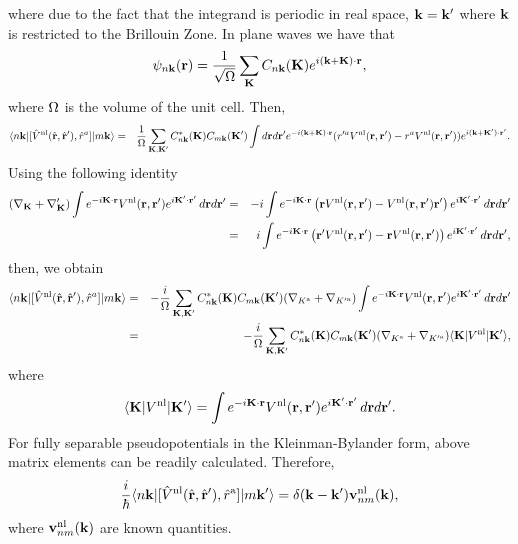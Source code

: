 \documentclass[floatfix,prb,aps,superscriptaddress,11pt,preprint]{revtex4}
\begin{document}
where due to the fact that the integrand is periodic in real space,
$\mathbf{k}=\mathbf{k}'$ where $\mathbf{k}$ is restricted to the Brillouin Zone.
In plane waves we have that
\begin{eqnarray}\label{cn3}
\psi_{n\mathbf{k}}(\mathbf{r})=\frac{1}{\sqrt{\Omega}}
\sum_{\mathbf{K}} C_{n\mathbf{k}}(\mathbf{K})e^{i(\mathbf{k}+\mathbf{K})\cdot\mathbf{r}}
,
\end{eqnarray}
where $\Omega$ is the volume of the unit cell.
Then,
\begin{eqnarray}\label{cn4}
\langle n\mathbf{k} |[\hat V^{\mathrm{nl}}(\hat{\mathbf{r}},\hat{\mathbf{r}}'),\hat r^a]| m\mathbf{k} \rangle
&=&
\frac{1}{\Omega}
\sum_{\mathbf{K},\mathbf{K}'} 
C^*_{n\mathbf{k}}(\mathbf{K}) 
C_{m\mathbf{k}}(\mathbf{K}')
\int d\mathbf{r} d\mathbf{r}' 
e^{-i(\mathbf{k}+\mathbf{K})\cdot \mathbf{r}}
 ( 
r'^a V^{\mathrm{nl}}(\mathbf{r},\mathbf{r}')
- 
r^aV^{\mathrm{nl}}(\mathbf{r},\mathbf{r}')
) 
e^{i(\mathbf{k}+\mathbf{K}')\cdot \mathbf{r}'}
.
\nonumber\\
\end{eqnarray} 
Using the following identity 
\begin{eqnarray}\label{cn5}
(\nabla_{\mathbf{K}}+\nabla_{\mathbf{K}}')
\int e^{-i\mathbf{K}\cdot\mathbf{r}}
V^{\mathrm{nl}}(\mathbf{r},\mathbf{r}')
e^{i\mathbf{K}'\cdot\mathbf{r}'}
\,d\mathbf{r} d\mathbf{r}'
&=&
-i
\int e^{-i\mathbf{K}\cdot\mathbf{r}}
\left(
\mathbf{r}
V^{\mathrm{nl}}(\mathbf{r},\mathbf{r}')
-
V^{\mathrm{nl}}(\mathbf{r},\mathbf{r}')
\mathbf{r}'
\right)
e^{i\mathbf{K}'\cdot\mathbf{r}'}
\,d\mathbf{r} d\mathbf{r}'
\nonumber\\
&=&
i
\int e^{-i\mathbf{K}\cdot\mathbf{r}}
\left(
\mathbf{r}'
V^{\mathrm{nl}}(\mathbf{r},\mathbf{r}')
-
\mathbf{r}
 V^{\mathrm{nl}}(\mathbf{r},\mathbf{r}')
\right)
e^{i\mathbf{K}'\cdot\mathbf{r}'}
\,d\mathbf{r} d\mathbf{r}'
,
\nonumber\\
\end{eqnarray}
then, we obtain
\begin{eqnarray}\label{cn5}
\langle n\mathbf{k} |[\hat V^{\mathrm{nl}}(\hat{\mathbf{r}},\hat{\mathbf{r}}'),\hat r^a]| m\mathbf{k} \rangle
&=&
-\frac{i}{\Omega}
\sum_{\mathbf{K},\mathbf{K}'}
C^*_{n\mathbf{k}}(\mathbf{K})
C_{m\mathbf{k}}(\mathbf{K}')
(\nabla_{K^{\mathrm{a}}}+\nabla_{K'^{\mathrm{a}}})
\int e^{-i\mathbf{K}\cdot\mathbf{r}}
V^{\mathrm{nl}}(\mathbf{r},\mathbf{r}')
e^{i\mathbf{K}'\cdot\mathbf{r}'}
\,d\mathbf{r} d\mathbf{r}'
\nonumber\\
&=&
-\frac{i}{\Omega}
\sum_{\mathbf{K},\mathbf{K}'}
C^*_{n\mathbf{k}}(\mathbf{K})
C_{m\mathbf{k}}(\mathbf{K}')
(\nabla_{K^{\mathrm{a}}}+\nabla_{K'^{\mathrm{a}}})
\langle \mathbf{K} | 
V^{\mathrm{nl}}
| \mathbf{K}' \rangle 
,
\end{eqnarray}
where
\begin{eqnarray}\label{cn6}
\langle \mathbf{K} | 
V^{\mathrm{nl}}
| \mathbf{K}' \rangle 
=
\int e^{-i\mathbf{K}\cdot\mathbf{r}}
V^{\mathrm{nl}}(\mathbf{r},\mathbf{r}')
e^{i\mathbf{K}'\cdot\mathbf{r}'}
\,d\mathbf{r} d\mathbf{r}'
.
\end{eqnarray}
For fully  separable pseudopotentials in the 
Kleinman-Bylander form,\cite{mottaCMS10,kleinmanPRL82,adolphPRB96}
above matrix elements 
can be readily calculated.\cite{francesco}
Therefore,
\begin{eqnarray}\label{cn8}
\frac{i}{\hbar}
\langle n\mathbf{k} |[\hat V^{\mathrm{nl}}(\hat{\mathbf{r}},\hat{\mathbf{r}}'),\hat r^{\mathrm{a}}]| m\mathbf{k}' \rangle
=\delta(\mathbf{k}-\mathbf{k}') \mathbf{v}^{\mathrm{nl}}_{nm}(\mathbf{k})
,
\end{eqnarray}
where $\mathbf{v}^{\mathrm{nl}}_{nm}(\mathbf{k})$ are known quantities.
\end{document}
